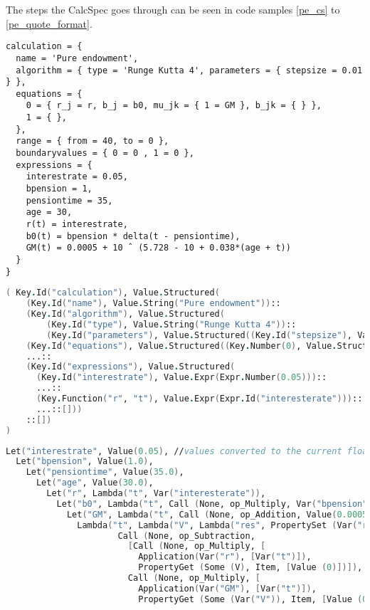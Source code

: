 The steps the CalcSpec goes through can be seen in code samples \ref{pe_cs} to \ref{pe_quote_format}.

\begin{lstlisting}[language=calcspec, caption=Pure endowment in CalcSpec, label=pe_cs]
calculation = {
  name = 'Pure endowment',
  algorithm = { type = 'Runge Kutta 4', parameters = { stepsize = 0.01 } },
  equations = {
    0 = { r_j = r, b_j = b0, mu_jk = { 1 = GM }, b_jk = { } },
    1 = { },
  },
  range = { from = 40, to = 0 },
  boundaryvalues = { 0 = 0 , 1 = 0 },
  expressions = {
    interestrate = 0.05,
    bpension = 1,
    pensiontime = 35,
    age = 30,
    r(t) = interestrate,
    b0(t) = bpension * delta(t - pensiontime),
    GM(t) = 0.0005 + 10 ˆ (5.728 - 10 + 0.038*(age + t))
  }
}
\end{lstlisting}

\begin{lstlisting}[language=fsharp, caption=Abstract Syntax Tree for the Pure endowment CalcSpec, label=pe_ast]
( Key.Id("calculation"), Value.Structured(
    (Key.Id("name"), Value.String("Pure endowment"))::
    (Key.Id("algorithm"), Value.Structured(
        (Key.Id("type"), Value.String("Runge Kutta 4"))::
        (Key.Id("parameters"), Value.Structured((Key.Id("stepsize"), Value.Expr(Expr.Number(0.01)))::[])))::[])::
    (Key.Id("equations"), Value.Structured((Key.Number(0), Value.Structured(...:[]))::[]))::
    ...::
    (Key.Id("expressions"), Value.Structured(
      (Key.Id("interestrate"), Value.Expr(Expr.Number(0.05)))::
      ...::
      (Key.Function("r", "t"), Value.Expr(Expr.Id("interesterate")))::
      ...::[]))
    ::[])
)
\end{lstlisting}

\begin{lstlisting}[language=fsharp, caption=Quotation AST for dV method generated from CalcSpec AST, label=pe_quote]
Let("interestrate", Value(0.05), //values converted to the current floatP type
  Let("bpension", Value(1.0), 
    Let("pensiontime", Value(35.0), 
      Let("age", Value(30.0), 
        Let("r", Lambda("t", Var("interesterate")), 
          Let("b0", Lambda("t", Call (None, op_Multiply, Var("bpension")::[Application(Var("delta"), Call (None, op_Subtraction, Var("t")::[Var("pensiontime")]))])), 
            Let("GM", Lambda("t", Call (None, op_Addition, Value(0.0005)::[...])), 
              Lambda("t", Lambda("V", Lambda("res", PropertySet (Var("res"), Item, [Value (0),
                      Call (None, op_Subtraction,
                        [Call (None, op_Multiply, [
                          Application(Var("r"), [Var("t")]),
                          PropertyGet (Some (V), Item, [Value (0)])]),
                        Call (None, op_Multiply, [
                          Application(Var("GM"), [Var("t")]),
                          PropertyGet (Some (Var("V")), Item, [Value (0)])])])]))))))))))))
\end{lstlisting}


